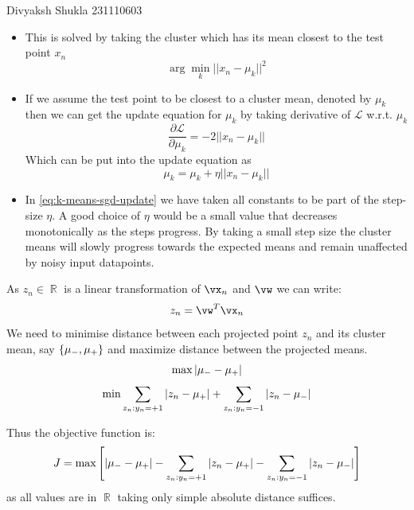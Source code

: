 \documentclass[a4paper,11pt]{article}
\begin{document}
{Divyaksh Shukla}   %
{231110603}	%

\date{November 8, 2023}

\begin{mlsolution}

\begin{itemize}
    \item This is solved by taking the cluster which has its mean closest to the test point $x_n$ $$ \arg\min_{k}||x_n-\mu_k||^{2} $$
    \item If we assume the test point to be closest to a cluster mean, denoted by $\mu_{k}$ then we can get the update equation for $\mu_{k}$ by taking derivative of $\mathcal{L}$ w.r.t. $\mu_{k}$ $$ \frac{\partial \mathcal{L}}{\partial \mu_{k}} = -2||x_{n} - \mu_{k}|| $$ Which can be put into the update equation as \begin{equation}
        \mu_{k} = \mu_{k} + \eta ||x_{n} - \mu_{k}||
        \label{eq:k-means-sgd-update}
    \end{equation}
    \item In \ref{eq:k-means-sgd-update} we have taken all constants to be part of the step-size $\eta$. A good choice of $\eta$ would be a small value that decreases monotonically as the steps progress. By taking a small step size the cluster means will slowly progress towards the expected means and remain unaffected by noisy input datapoints.
\end{itemize}



\end{mlsolution}

\begin{mlsolution} 

As $z_n \in \mathop{\mathbb{R}}$ is a linear transformation of $\vx_n$ and $\vw$ we can write:
$$z_n=\vw^T\vx_n$$
We need to minimise distance between each projected point $z_n$ and its cluster mean, say $\left\{{\mu_-, \mu_+}\right\}$ and maximize distance between the projected means.
\begin{equation}
    \max \left| {\mu_- - \mu_+} \right|
\end{equation}
\begin{equation}
    \min \sum_{z_n:y_n=+1}{\left| {z_n - \mu_+} \right|} + \sum_{z_n:y_n=-1}{\left| {z_n - \mu_-} \right|}
\end{equation}

\noindent Thus the objective function is:
\begin{equation}
    J = \max\left[ \left| {\mu_- - \mu_+} \right| - \sum_{z_n:y_n=+1}{\left| {z_n - \mu_+} \right|} - \sum_{z_n:y_n=-1}{\left| {z_n - \mu_-} \right|} \right]
\end{equation}
as all values are in $\mathop{\mathbb{R}}$ taking only simple absolute distance suffices.


\end{mlsolution}
\end{document}
